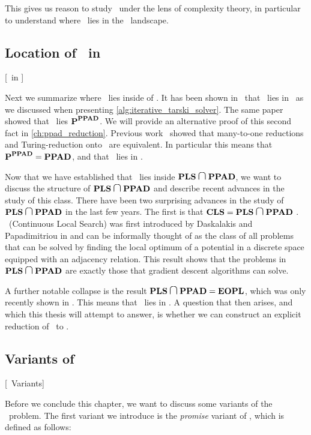 This gives us reason to study \Tarski\ under the lens of complexity theory, in particular to understand where \Tarski\ lies in the \TFNP\ landscape.

\subsection{Location of \Tarski\ in \TFNP}[\Tarski\ in \TFNP]

Next we summarize where \Tarski\ lies inside of \TFNP. It has been shown in~\cite{etessami_tarskis_2020} that \Tarski\ lies in \PLS\ as we discussed when presenting \cref{alg:iterative_tarski_solver}. The same paper showed that \Tarski\ lies $\textbf{P}^{\textbf{PPAD}}$. We will provide an alternative proof of this second fact in \cref{ch:ppad_reduction}. Previous work~ showed that many-to-one reductions and Turing-reduction onto \PPAD\ are equivalent. In particular this means that $\textbf{P}^{\textbf{PPAD}} = \textbf{PPAD}$, and that \Tarski\ lies in \PPAD{}.

Now that we have established that \Tarski\ lies inside $\PLS \medcap \PPAD$, we want to discuss the structure of $\PLS \medcap \PPAD$ and describe recent advances in the study of this class. There have been two surprising advances in the study of $\PLS \medcap \PPAD$ in the last few years. The first is that $\CLS = \PLS \medcap \PPAD$ . \CLS\ (Continuous Local Search) was first introduced by Daskalakis and Papadimitriou in  and can be informally thought of as the class of all problems that can be solved by finding the local optimum of a potential in a discrete space equipped with an adjacency relation. This result shows that the problems in $\PLS \medcap \PPAD$ are exactly those that gradient descent algorithms can solve.

A further notable collapse is the result $\PLS \medcap \PPAD = \EOPL$, which was only recently shown in . This means that \Tarski\ lies in \EOPL. A question that then arises, and which this thesis will attempt to answer, is whether we can construct an explicit reduction of \Tarski\ to \EndOfPotentialLine.

\subsection{Variants of \Tarski}[\Tarski\ Variants]

Before we conclude this chapter, we want to discuss some variants of the \Tarski\ problem. The first variant we introduce is the \emph{promise} variant of \Tarski, which is defined as follows:

